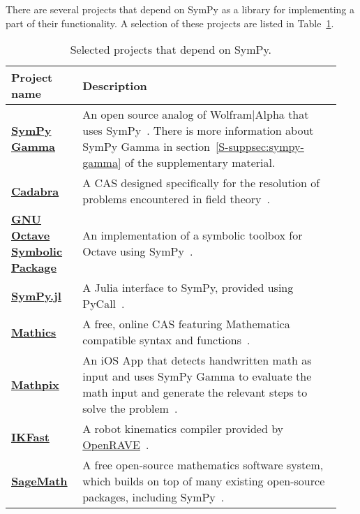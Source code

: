 There are several projects that depend on SymPy as a library for implementing
a part of their functionality. A selection of these projects are listed in
Table~\ref{projects-table}.

\begin{longtable}[htbc]{>{\raggedright}p{0.2\linewidth}p{0.74\linewidth}}
\caption{Selected projects that depend on SymPy.\label{projects-table}}\\
\toprule
\textbf{Project name} & \textbf{Description} \\
\midrule

\href{http://sympygamma.com/}{\textbf{SymPy Gamma}} & An open source
  analog of Wolfram|Alpha that uses SymPy~\cite{SymPyGamma}.  There is more
  information about SymPy Gamma in section~\ref{S-suppsec:sympy-gamma} of the
  supplementary material. \\

\href{http://cadabra.science/index.html}{\textbf{Cadabra}} &
  A CAS designed specifically for the resolution of problems
  encountered in field theory~\cite{Peeters2007cadabra}. \\

\href{https://github.com/cbm755/octsympy}{\textbf{GNU Octave Symbolic Package}} &
  An implementation of a symbolic toolbox for Octave using SymPy~\cite{OctSymPy}. \\

\href{https://github.com/jverzani/SymPy.jl}{\textbf{SymPy.jl}} &
  A Julia interface to SymPy, provided using PyCall~\cite{SymPy.jl}. \\

\href{https://mathics.github.io/}{\textbf{Mathics}} &
  A free, online CAS featuring Mathematica compatible
  syntax and functions~\cite{Mathics}. \\

\href{http://mathpix.com/}{\textbf{Mathpix}} & An iOS App that detects handwritten math as input and uses
  SymPy Gamma to evaluate the math input and generate the relevant
  steps to solve the problem~\cite{Mathpix}. \\

\href{http://openrave.org/docs/latest_stable/openravepy/ikfast/}{\textbf{IKFast}} &
  A robot kinematics compiler provided by
  \href{http://openrave.org/}{OpenRAVE}~\cite{diankov2010ikfast}. \\

\href{http://www.sagemath.org/}{\textbf{SageMath}} &
  A free open-source mathematics software system, which builds on top of many
  existing open-source packages, including SymPy~\cite{sagemath}. \\


\end{longtable}
